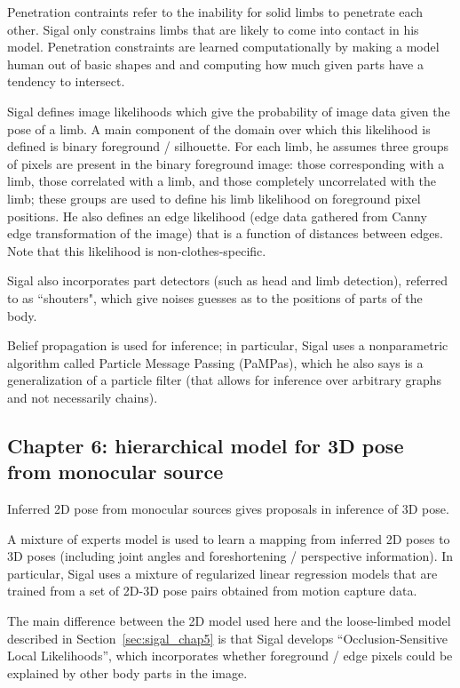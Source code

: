 \documentclass{article}
\begin{document}
Penetration contraints refer to the inability for solid limbs to penetrate each other.
Sigal only constrains limbs that are likely to come into contact in his model.
Penetration constraints are learned computationally by making a model human out of basic shapes and and computing how much given parts have a tendency to intersect.

Sigal defines image likelihoods which give the probability of image data given the pose of a limb.
A main component of the domain over which this likelihood is defined is binary foreground / silhouette.
For each limb, he assumes three groups of pixels are present in the binary foreground image: those corresponding with a limb, those correlated with a limb, and those completely uncorrelated with the limb; these groups are used to define his limb likelihood on foreground pixel positions.
He also defines an edge likelihood (edge data gathered from Canny edge transformation of the image) that is a function of distances between edges.
Note that this likelihood is non-clothes-specific.

Sigal also incorporates part detectors (such as head and limb detection), referred to as ``shouters", which give noises guesses as to the positions of parts of the body.

Belief propagation is used for inference; in particular, Sigal uses a nonparametric algorithm called Particle Message Passing (PaMPas), which he also says is a generalization of a particle filter (that allows for inference over arbitrary graphs and not necessarily chains).


\subsection{Chapter 6: hierarchical model for 3D pose from monocular source}

Inferred 2D pose from monocular sources gives proposals in inference of 3D pose.

A mixture of experts model is used to learn a mapping from inferred 2D poses to 3D poses (including joint angles and foreshortening / perspective information). In particular, Sigal uses a mixture of regularized linear regression models that are trained from a set of 2D-3D pose pairs obtained from motion capture data.

The main difference between the 2D model used here and the loose-limbed model described in Section~\ref{sec:sigal_chap5} is that Sigal develops ``Occlusion-Sensitive Local Likelihoods'', which incorporates whether foreground / edge pixels could be explained by other body parts in the image.
\end{document}
